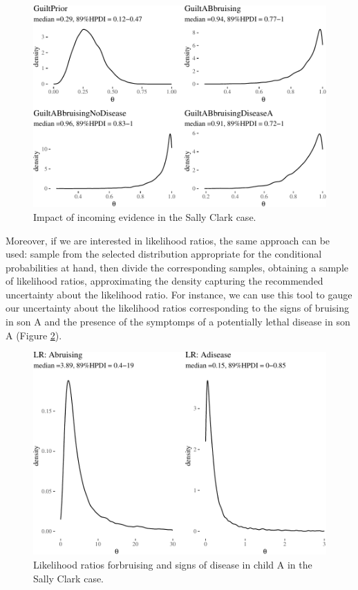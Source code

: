 \documentclass[
  10pt,
  dvipsnames,enabledeprecatedfontcommands]{scrartcl}
\begin{document}
\begin{figure}[H]

\begin{center}\includegraphics[width=0.9\linewidth]{chapter-outline_files/figure-latex/SCwithHOP2-1} \end{center}


\caption{Impact of incoming evidence in the Sally Clark case.}
\label{fig:SCwithHOP2}
\end{figure}

Moreover, if we are interested in likelihood ratios, the same approach
can be used: sample from the selected distribution appropriate for the
conditional probabilities at hand, then divide the corresponding
samples, obtaining a sample of likelihood ratios, approximating the
density capturing the recommended uncertainty about the likelihood
ratio. For instance, we can use this tool to gauge our uncertainty about
the likelihood ratios corresponding to the signs of bruising in son A
and the presence of the symptomps of a potentially lethal disease in son
A (Figure \ref{fig:SClrs}).

\begin{figure}[H]


\begin{center}\includegraphics[width=0.9\linewidth]{chapter-outline_files/figure-latex/SClrs-1} \end{center}

\caption{Likelihood ratios forbruising and signs of disease in child A in the Sally Clark case.}
\label{fig:SClrs}

\end{figure}
\end{document}
